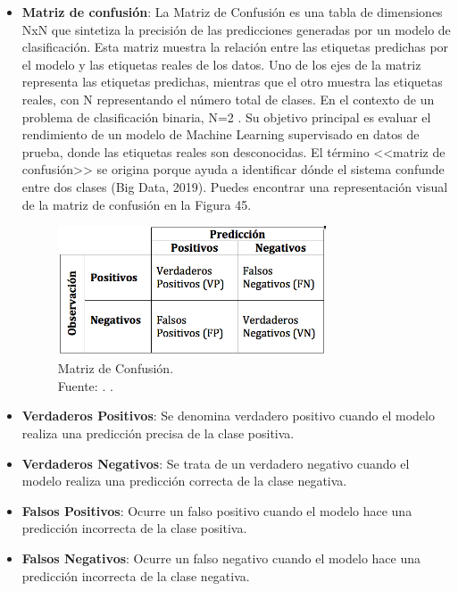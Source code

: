 \begin{itemize}
\item \textbf{Matriz de confusión}: La Matriz de Confusión es una tabla de dimensiones NxN que sintetiza la precisión de las predicciones generadas por un modelo de clasificación. Esta matriz muestra la relación entre las etiquetas predichas por el modelo y las etiquetas reales de los datos. Uno de los ejes de la matriz representa las etiquetas predichas, mientras que el otro muestra las etiquetas reales, con N representando el número total de clases. En el contexto de un problema de clasificación binaria, N=2 \parencite{gl_kohavi1998ml_glossary}. Su objetivo principal es evaluar el rendimiento de un modelo de Machine Learning supervisado en datos de prueba, donde las etiquetas reales son desconocidas. El término <<matriz de confusión>> se origina porque ayuda a identificar dónde el sistema confunde entre dos clases (Big Data, 2019). Puedes encontrar una representación visual de la matriz de confusión en la Figura 45.
\begin{figure}[H]
	\centering
	\includegraphics[width=0.75\textwidth]{3/figures/matriz_confusion.png}
	\caption[Matriz de Confusión]{Matriz de Confusión.\\ Fuente: \cite{gl_izco2018bdc}. .}
	\label{3:9}
\end{figure}
\end{itemize}

\begin{itemize}
    \item \textbf{Verdaderos Positivos}: Se denomina verdadero positivo cuando el modelo realiza una predicción precisa de la clase positiva.
    \item \textbf{Verdaderos Negativos}: Se trata de un verdadero negativo cuando el modelo realiza una predicción correcta de la clase negativa.
    \item \textbf{Falsos Positivos}: Ocurre un falso positivo cuando el modelo hace una predicción incorrecta de la clase positiva. 
    \item \textbf{Falsos Negativos}: Ocurre un falso negativo cuando el modelo hace una predicción incorrecta de la clase negativa. 
    \end{itemize}

